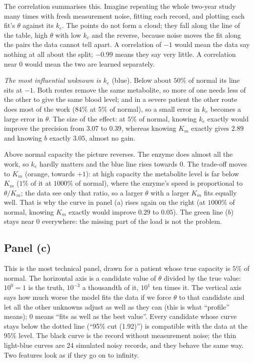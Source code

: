 \documentclass[11pt,a4paper]{article}
\begin{document}
The correlation summarises this. Imagine repeating the whole two-year study many times with fresh
measurement noise, fitting each record, and plotting each fit's $\theta$ against its $k_e$. The
points do not form a cloud; they fall along the line of the table, high $\theta$ with low $k_e$
and the reverse, because noise moves the fit along the pairs the data cannot tell apart. A
correlation of $-1$ would mean the data say nothing at all about the split; $-0.99$ means they
say very little. A correlation near $0$ would mean the two are learned separately.

\emph{The most influential unknown is $k_e$} (blue). Below about $50\%$ of normal its line sits at
$-1$. Both routes remove the same metabolite, so more of one needs less of the other to give the
same blood level; and in a severe patient the other route does most of the work ($84\%$ at $5\%$ of
normal), so a small error in $k_e$ becomes a large error in $\theta$. The size of the effect: at
$5\%$ of normal, knowing $k_e$ exactly would improve the precision from $3.07$ to $0.39$, whereas
knowing $K_m$ exactly gives $2.89$ and knowing $b$ exactly $3.05$, almost no gain.

Above normal capacity the picture reverses. The enzyme does almost all the work, so $k_e$ hardly
matters and the blue line rises towards $0$. The trade-off moves to $K_m$ (orange, towards $+1$):
at high capacity the metabolite level is far below $K_m$ ($1\%$ of it at $1000\%$ of normal), where
the enzyme's speed is proportional to $\theta/K_m$; the data see only that ratio, so a larger
$\theta$ with a larger $K_m$ fits equally well. That is why the curve in panel (a) rises again on
the right (at $1000\%$ of normal, knowing $K_m$ exactly would improve $0.29$ to $0.05$). The green
line ($b$) stays near $0$ everywhere: the missing part of the load is not the problem.

\subsection{Panel (c)} This is the most technical panel, drawn for a patient whose true
capacity is $5\%$ of normal. The horizontal axis is a candidate value of $\theta$ divided by the
true value: $10^0=1$ is the truth, $10^{-3}$ a thousandth of it, $10^1$ ten times it. The
vertical axis says how much worse the model fits the data if we force $\theta$ to that candidate
and let all the other unknowns adjust as well as they can (this is what ``profile'' means); $0$
means ``fits as well as the best value''. Every candidate whose curve stays below the dotted line
(``95\% cut (1.92)'') is compatible with the data at the $95\%$ level. The black curve is the
record without measurement noise; the thin light-blue curves are 24 simulated noisy records,
and they behave the same way. Two features look as if they go on to infinity.
\end{document}

